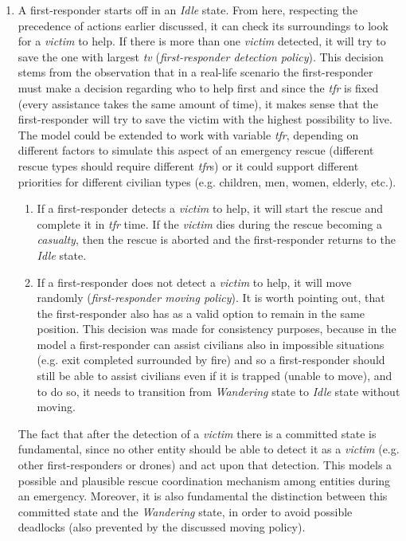 \begin{enumerate}
	\item A first-responder starts off in an \textit{Idle} state. From here, respecting the precedence of actions earlier discussed, it can check its surroundings to look for a \textit{victim} to help. If there is more than one \textit{victim} detected, it will try to save the one with largest \textit{tv} (\textit{first-responder detection policy}). This decision stems from the observation that in a real-life scenario the first-responder must make a decision regarding who to help first and since the \textit{tfr} is fixed (every assistance takes the same amount of time), it makes sense that the first-responder will try to save the victim with the highest possibility to live. The model could be extended to work with variable \textit{tfr}, depending on different factors to simulate this aspect of an emergency rescue (different rescue types should require different \textit{tfr}s) or it could support different priorities for different civilian types (e.g. children, men, women, elderly, etc.).
	\begin{enumerate}
		\item If a first-responder detects a \textit{victim} to help, it will start the rescue and complete it in \textit{tfr} time. If the \textit{victim} dies during the rescue becoming a \textit{casualty}, then the rescue is aborted and the first-responder returns to the \textit{Idle} state.
		\item If a first-responder does not detect a \textit{victim} to help, it will move randomly (\textit{first-responder moving policy}). It is worth pointing out, that the first-responder also has as a valid option to remain in the same position. This decision was made for consistency purposes, because in the model a first-responder can assist civilians also in impossible situations (e.g. exit completed surrounded by fire) and so a first-responder should still be able to assist civilians even if it is trapped (unable to move), and to do so, it needs to transition from \textit{Wandering} state to \textit{Idle} state without moving.
	\end{enumerate}
	The fact that after the detection of a \textit{victim} there is a committed state is fundamental, since no other entity should be able to detect it as a \textit{victim} (e.g. other first-responders or drones) and act upon that detection. This models a possible and plausible rescue coordination mechanism among entities during an emergency.\newline
	Moreover, it is also fundamental the distinction between this committed state and the \textit{Wandering} state, in order to avoid possible deadlocks (also prevented by the discussed moving policy).
	

\end{enumerate}
